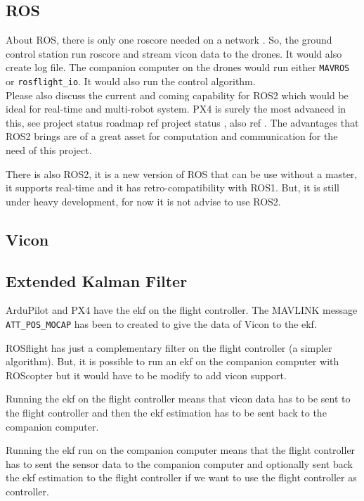 \subsection{ROS}
About ROS, there is only one roscore needed on a network \cite{stackoverflow_multi_machine}.
So, the ground control station run roscore and stream vicon data to the drones. It would also create log file.
The companion computer on the drones would run either \texttt{MAVROS} or \texttt{rosflight\_io}.
It would also run the control algorithm.
{\color{red} \\Please also discuss the current and coming capability for ROS2 which would be ideal for real-time and multi-robot system. PX4 is surely the most advanced in this, see project status roadmap ref project status \cite{px4}, also ref \cite{ros_wiki_ng_drones}. The advantages that ROS2 brings are of a great asset for computation and communication for the need of this project.\\}

There is also ROS2, it is a new version of ROS that can be use without a master, it supports real-time and it has retro-compatibility with ROS1. But, it is still under heavy development, for now it is not advise to use ROS2.

\subsection{Vicon}
\cite{ros_wiki_vicon_bridge}
\cite{px4_vicon}
\cite{ardupilot_vicon}

\subsection{Extended Kalman Filter}
ArduPilot and PX4 have the \gls{ekf} on the flight controller.
The MAVLINK message \texttt{ATT\_POS\_MOCAP} has been to created to give the data of Vicon to the \gls{ekf}.

ROSflight has just a complementary filter on the flight controller (a simpler algorithm).
But, it is possible to run an \gls{ekf} on the companion computer with ROScopter but it would have to be modify to add vicon support.

Running the \gls{ekf} on the flight controller means that vicon data has to be sent to the flight controller and then the \gls{ekf} estimation has to be sent back to the companion computer.

Running the \gls{ekf} run on the companion computer means that the flight controller has to sent the sensor data to the companion computer and optionally sent back the \gls{ekf} estimation to the flight controller if we want to use the flight controller as controller.

